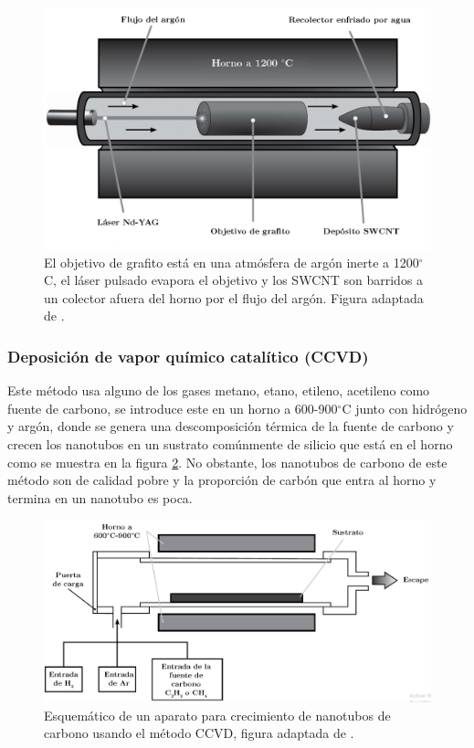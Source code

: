 \begin{figure}[!h]
    \centering
    \includegraphics[width=.6\textwidth,keepaspectratio=true]{CNT/laserablationmethod.png}
    \caption{El objetivo de grafito está en una atmósfera de argón inerte a 1200$^{\circ}$C, el láser pulsado evapora el objetivo y los SWCNT son barridos a un colector afuera del horno por el flujo del argón. Figura adaptada de \cite{Melendez2016}.}
    \label{fig:ablationlasermethod}
\end{figure}

\subsubsection{Deposición de vapor químico catalítico (CCVD)}

Este método usa alguno de los gases metano, etano, etileno, acetileno como fuente de carbono, se introduce este en un horno a 600-900$^{\circ}$C junto con hidrógeno y argón, donde se genera una descomposición térmica de la fuente de carbono y crecen los nanotubos en un sustrato comúnmente de silicio que está en el horno como se muestra en la figura \ref{fig:ccvdmethod}. No obstante, los nanotubos de carbono de este método son de calidad pobre y la proporción de carbón que entra al horno y termina en un nanotubo es poca.

\begin{figure}[!h]
    \centering
    \includegraphics[width=.6\textwidth,keepaspectratio=true]{CNT/CCVD.png}
    \caption{Esquemático de un aparato  para crecimiento de nanotubos de carbono usando el método CCVD, figura adaptada de \cite{Melendez2016}.}
    \label{fig:ccvdmethod}
\end{figure}

